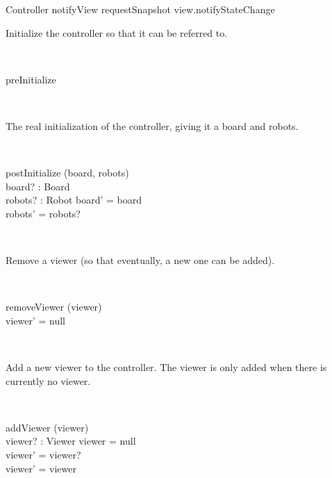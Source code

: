 \documentclass[12pt]{article}
\begin{document}
\begin{class}{Controller}
notifyView \sdef requestSnapshot \comp view.notifyStateChange
\znewpage
\begin{zpar}
Initialize the controller so that it can be referred to.
\end{zpar} \\
\begin{schema}{preInitialize}
\end{schema}\\
\begin{zpar}
The real initialization of the controller, giving it a board and robots.
\end{zpar} \\
\begin{schema}{postInitialize}
\Delta (board, robots) \\
board? : Board \\
robots? : \power Robot
\where
board' = board \\
robots' = robots?
\end{schema}\\
\begin{zpar}
Remove a viewer (so that eventually, a new one can be added).
\end{zpar} \\
\begin{schema}{removeViewer}
\Delta(viewer) \\
\where
viewer' = null
\end{schema}\\
\begin{zpar}
Add a new viewer to the controller. The viewer is only added when there is currently no viewer.
\end{zpar} \\
\begin{schema}{addViewer}
\Delta(viewer) \\
viewer? : Viewer
\where
\IF viewer = null \\
\THEN viewer' = viewer? \\
\ELSE viewer' = viewer
\end{schema}
\end{class}
\end{document}
